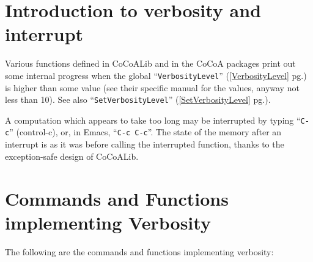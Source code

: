 \documentclass[a4paper]{mybook}
\begin{document}
\section{Introduction to verbosity and interrupt}
\label{Introduction to verbosity and interrupt}

        
Various functions defined in CoCoALib and in the CoCoA packages print
out some internal progress when the global ``\verb&VerbosityLevel&'' (\ref{VerbosityLevel} pg.\pageref{VerbosityLevel})
is higher than some value (see their specific manual for the values,
anyway not less than 10).  See also ``\verb&SetVerbosityLevel&'' (\ref{SetVerbosityLevel} pg.\pageref{SetVerbosityLevel}).
\par 
A computation which appears to take too long may be interrupted by
typing ``\verb&C-c&'' (control-c), or, in Emacs, ``\verb&C-c C-c&''.
The state of the memory after an interrupt is as it was before calling
the interrupted function, thanks to the exception-safe design of CoCoALib.


\section{Commands and Functions implementing Verbosity}
\label{Commands and Functions implementing Verbosity}

        
The following are the commands and functions implementing verbosity:
\end{document}
